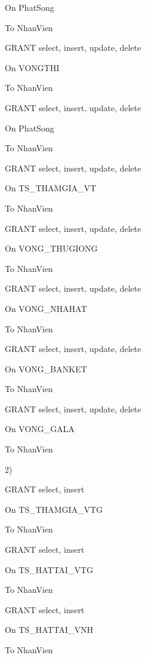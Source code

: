 \documentclass{report}
\begin{document}
On PhatSong

To NhanVien

\bigskip

GRANT select, insert, update, delete

On VONGTHI

To NhanVien

\bigskip

GRANT select, insert, update, delete

On PhatSong

To NhanVien

\bigskip

GRANT select, insert, update, delete

On TS\_THAMGIA\_VT

To NhanVien

\bigskip

GRANT select, insert, update, delete

On VONG\_THUGIONG

To NhanVien

\bigskip

GRANT select, insert, update, delete

On VONG\_NHAHAT

To NhanVien

\bigskip

GRANT select, insert, update, delete

On VONG\_BANKET

To NhanVien

\bigskip

GRANT select, insert, update, delete

On VONG\_GALA

To NhanVien

\bigskip


\setlength{\parindent}{0cm}
2)


\setlength{\parindent}{0.5cm}

GRANT select, insert

On TS\_THAMGIA\_VTG

To NhanVien

\bigskip

GRANT select, insert

On TS\_HATTAI\_VTG

To NhanVien

\bigskip

GRANT select, insert

On TS\_HATTAI\_VNH

To NhanVien

\bigskip
\end{document}
